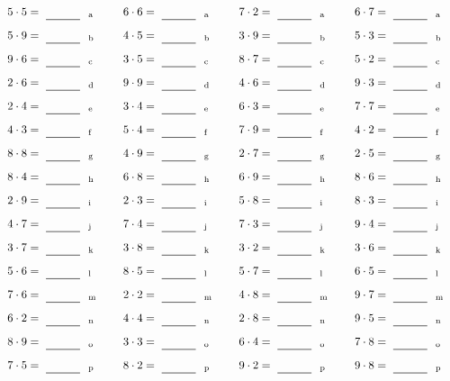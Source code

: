 \documentclass
[
  draft    = true,
  fontsize = 11pt,
  parskip  = half-
]
{scrartcl}
\begin{document}
\par\vfill\par
\begin{align*}
    \pline{5\cdot5}&=\rline{a}
  & \pline{6\cdot6}&=\rline{a}
  & \pline{7\cdot2}&=\rline{a}
  & \pline{6\cdot7}&=\rline{a} \\[1ex]
    \pline{5\cdot9}&=\rline{b}
  & \pline{4\cdot5}&=\rline{b}
  & \pline{3\cdot9}&=\rline{b}
  & \pline{5\cdot3}&=\rline{b} \\[1ex]
    \pline{9\cdot6}&=\rline{c}
  & \pline{3\cdot5}&=\rline{c}
  & \pline{8\cdot7}&=\rline{c}
  & \pline{5\cdot2}&=\rline{c} \\[1ex]
    \pline{2\cdot6}&=\rline{d}
  & \pline{9\cdot9}&=\rline{d}
  & \pline{4\cdot6}&=\rline{d}
  & \pline{9\cdot3}&=\rline{d} \\[1ex]
    \pline{2\cdot4}&=\rline{e}
  & \pline{3\cdot4}&=\rline{e}
  & \pline{6\cdot3}&=\rline{e}
  & \pline{7\cdot7}&=\rline{e} \\[1ex]
    \pline{4\cdot3}&=\rline{f}
  & \pline{5\cdot4}&=\rline{f}
  & \pline{7\cdot9}&=\rline{f}
  & \pline{4\cdot2}&=\rline{f} \\[1ex]
    \pline{8\cdot8}&=\rline{g}
  & \pline{4\cdot9}&=\rline{g}
  & \pline{2\cdot7}&=\rline{g}
  & \pline{2\cdot5}&=\rline{g} \\[1ex]
    \pline{8\cdot4}&=\rline{h}
  & \pline{6\cdot8}&=\rline{h}
  & \pline{6\cdot9}&=\rline{h}
  & \pline{8\cdot6}&=\rline{h} \\[1ex]
    \pline{2\cdot9}&=\rline{i}
  & \pline{2\cdot3}&=\rline{i}
  & \pline{5\cdot8}&=\rline{i}
  & \pline{8\cdot3}&=\rline{i} \\[1ex]
    \pline{4\cdot7}&=\rline{j}
  & \pline{7\cdot4}&=\rline{j}
  & \pline{7\cdot3}&=\rline{j}
  & \pline{9\cdot4}&=\rline{j} \\[1ex]
    \pline{3\cdot7}&=\rline{k}
  & \pline{3\cdot8}&=\rline{k}
  & \pline{3\cdot2}&=\rline{k}
  & \pline{3\cdot6}&=\rline{k} \\[1ex]
    \pline{5\cdot6}&=\rline{l}
  & \pline{8\cdot5}&=\rline{l}
  & \pline{5\cdot7}&=\rline{l}
  & \pline{6\cdot5}&=\rline{l} \\[1ex]
    \pline{7\cdot6}&=\rline{m}
  & \pline{2\cdot2}&=\rline{m}
  & \pline{4\cdot8}&=\rline{m}
  & \pline{9\cdot7}&=\rline{m} \\[1ex]
    \pline{6\cdot2}&=\rline{n}
  & \pline{4\cdot4}&=\rline{n}
  & \pline{2\cdot8}&=\rline{n}
  & \pline{9\cdot5}&=\rline{n} \\[1ex]
    \pline{8\cdot9}&=\rline{o}
  & \pline{3\cdot3}&=\rline{o}
  & \pline{6\cdot4}&=\rline{o}
  & \pline{7\cdot8}&=\rline{o} \\[1ex]
    \pline{7\cdot5}&=\rline{p}
  & \pline{8\cdot2}&=\rline{p}
  & \pline{9\cdot2}&=\rline{p}
  & \pline{9\cdot8}&=\rline{p}
\end{align*}
\end{document}
